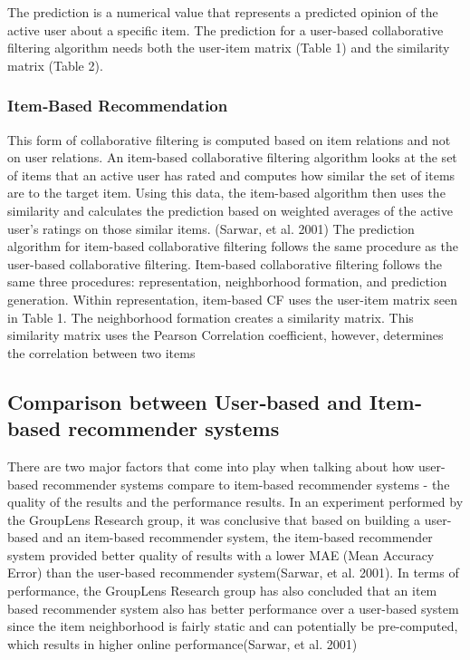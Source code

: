 The prediction is a numerical value that represents a predicted opinion of the active user about a specific item. The prediction for a user-based collaborative filtering algorithm needs both the user-item matrix (Table 1) and the similarity matrix (Table 2).
\subsubsection{Item‐Based Recommendation}
This form of collaborative filtering is computed based on item relations and not on user relations. An item-based collaborative filtering algorithm looks at the set of items that an active user has rated and computes how similar the set of items are to the target item. Using this data, the item-based algorithm then uses the similarity and calculates the prediction based on weighted averages of the active user’s ratings on those similar items. (Sarwar, et al. 2001)
The prediction algorithm for item-based collaborative filtering follows the same procedure as the user-based collaborative filtering. Item-based collaborative filtering follows the same three procedures: representation, neighborhood formation, and prediction generation. Within representation, item-based CF uses the user-item matrix seen in Table 1. The neighborhood formation creates a similarity matrix. This  similarity matrix uses the Pearson Correlation coefficient, however, determines the correlation between two items
\subsection{Comparison between User‐based and Item‐based recommender systems}
There are two major factors that come into play when talking about how user-based recommender systems compare to item-based recommender systems - the quality of the results and the performance results. 
In an experiment performed by the GroupLens Research group, it was conclusive that based on building a user-based and an item-based recommender system, the item-based recommender system provided better quality of results with a lower MAE (Mean Accuracy Error) than the user-based recommender system(Sarwar, et al. 2001). 
In terms of performance, the GroupLens Research group has also concluded that an  item based recommender system also has better performance over a user-based system since the item neighborhood is fairly static and can potentially be pre-computed, which results in higher online performance(Sarwar, et al. 2001)
